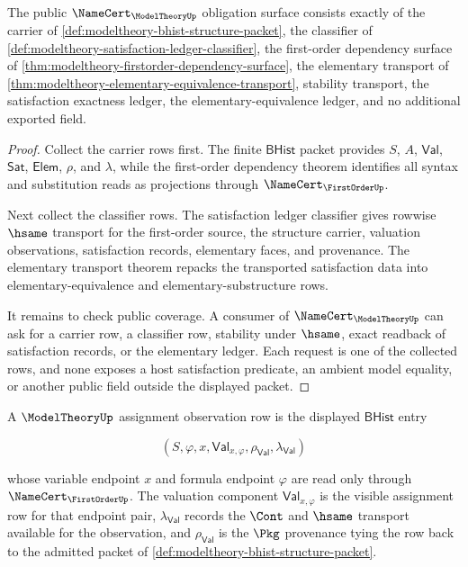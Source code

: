 \begin{theorem}\label{thm:modeltheory-namecert-obligation-surface}
The public $\NameCert_{\ModelTheoryUp}$ obligation surface consists exactly of
the carrier of \autoref{def:modeltheory-bhist-structure-packet}, the
classifier of \autoref{def:modeltheory-satisfaction-ledger-classifier}, the
first-order dependency surface of
\autoref{thm:modeltheory-firstorder-dependency-surface}, the elementary
transport of \autoref{thm:modeltheory-elementary-equivalence-transport},
stability transport, the satisfaction exactness ledger, the
elementary-equivalence ledger, and no additional exported field.
\end{theorem}
\begin{proof}
Collect the carrier rows first. The finite $\mathsf{BHist}$ packet provides
$S$, $A$, $\mathsf{Val}$, $\mathsf{Sat}$, $\mathsf{Elem}$, $\rho$, and
$\lambda$, while the first-order dependency theorem identifies all syntax and
substitution reads as projections through $\NameCert_{\FirstOrderUp}$.

Next collect the classifier rows. The satisfaction ledger classifier gives
rowwise $\hsame$ transport for the first-order source, the structure carrier,
valuation observations, satisfaction records, elementary faces, and
provenance. The elementary transport theorem repacks the transported
satisfaction data into elementary-equivalence and elementary-substructure
rows.

It remains to check public coverage. A consumer of
$\NameCert_{\ModelTheoryUp}$ can ask for a carrier row, a classifier row,
stability under $\hsame$, exact readback of satisfaction records, or the
elementary ledger. Each request is one of the collected rows, and none exposes
a host satisfaction predicate, an ambient model equality, or another public
field outside the displayed packet.
\end{proof}

\begin{definition}\label{def:modeltheory-assignment-observation-row}
A $\ModelTheoryUp$ assignment observation row is the displayed
$\mathsf{BHist}$ entry

$$
(S,\varphi,x,\mathsf{Val}_{x,\varphi},\rho_{\mathsf{Val}},
\lambda_{\mathsf{Val}})
$$

whose variable endpoint $x$ and formula endpoint $\varphi$ are read only
through $\NameCert_{\FirstOrderUp}$. The valuation component
$\mathsf{Val}_{x,\varphi}$ is the visible assignment row for that endpoint
pair, $\lambda_{\mathsf{Val}}$ records the $\Cont$ and $\hsame$ transport
available for the observation, and $\rho_{\mathsf{Val}}$ is the $\Pkg$
provenance tying the row back to the admitted packet of
\autoref{def:modeltheory-bhist-structure-packet}.
\end{definition}


